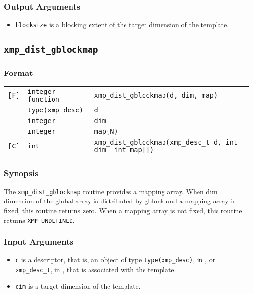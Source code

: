 \subsubsection*{Output Arguments}
\begin{itemize}
 \item {\tt blocksize} is a blocking extent of the target dimension of the template.
\end{itemize}


\subsection{\tt xmp\_dist\_gblockmap}

\subsubsection*{Format}

\begin{tabular}{lll}

\verb![F]!& {\tt integer function}& {\tt xmp\_dist\_gblockmap(d, dim, map)}\\
          & {\tt type(xmp\_desc)} & {\tt d}\\
          & {\tt integer} & {\tt dim}\\
          & {\tt integer} & {\tt map(N)}\\

\verb![C]!&  {\tt int}& {\tt xmp\_dist\_gblockmap(xmp\_desc\_t d, int dim, int map[])}\\

\end{tabular}

\subsubsection*{Synopsis}

The {\tt xmp\_dist\_gblockmap} routine provides a mapping array. When dim dimension of the global array is distributed by gblock and a mapping array is fixed, this routine returns zero. 
  When a mapping array is not fixed, this routine returns {\tt XMP\_UNDEFINED}.

\subsubsection*{Input Arguments}
\begin{itemize}
 \item {\tt d} is a descriptor, that is, an object of type 
       {\tt type(xmp\_desc)}, in {\XMPF}, or {\tt xmp\_desc\_t},
       in {\XMPC}, that is associated with the template.
 \item {\tt dim} is a target dimension of the template.
\end{itemize}

